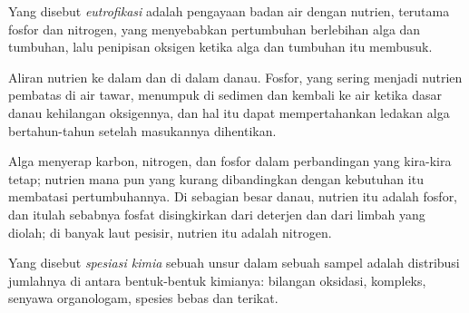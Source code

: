 \begin{definition}[Eutrofikasi]\label{def:b3:environmental-toxicology:eutrophication}
Yang disebut \emph{eutrofikasi} adalah pengayaan badan air
dengan nutrien, terutama fosfor dan nitrogen, yang menyebabkan pertumbuhan berlebihan
alga dan tumbuhan, lalu penipisan oksigen ketika alga dan tumbuhan itu membusuk.
\end{definition}

\begin{omfigure}

{\small Aliran nutrien ke dalam dan di dalam danau. Fosfor, yang sering menjadi nutrien
pembatas di air tawar, menumpuk di sedimen dan kembali ke air
ketika dasar danau kehilangan oksigennya, dan hal itu dapat mempertahankan ledakan alga bertahun-tahun setelah
masukannya dihentikan.}
\end{omfigure}

Alga menyerap karbon, nitrogen, dan fosfor dalam perbandingan yang kira-kira tetap;
nutrien mana pun yang kurang dibandingkan dengan kebutuhan itu membatasi pertumbuhannya. Di
sebagian besar danau, nutrien itu adalah fosfor, dan itulah sebabnya fosfat disingkirkan dari
deterjen dan dari limbah yang diolah; di banyak laut pesisir, nutrien itu adalah nitrogen.

\begin{definition}[Spesiasi]\label{def:b3:environmental-toxicology:speciation}
Yang disebut \emph{spesiasi kimia} sebuah unsur dalam sebuah
sampel adalah distribusi jumlahnya di antara bentuk-bentuk kimianya: bilangan
oksidasi, kompleks, senyawa organologam, spesies bebas dan terikat.
\end{definition}

